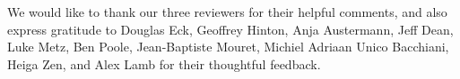 We would like to thank our three reviewers for their helpful comments, and also express gratitude to Douglas Eck, Geoffrey Hinton, Anja Austermann, Jeff Dean, Luke Metz, Ben Poole, Jean-Baptiste Mouret, Michiel Adriaan Unico Bacchiani, Heiga Zen, and Alex Lamb for their thoughtful feedback.%
